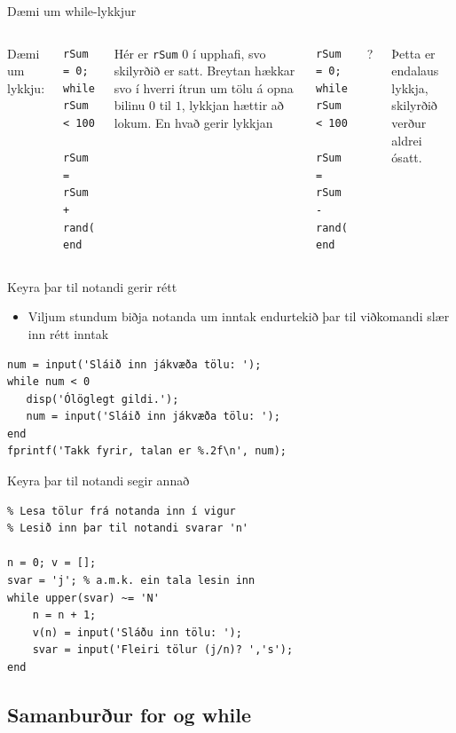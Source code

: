 \documentclass{beamer}
\begin{document}
\begin{frame}[fragile]{Dæmi um while-lykkjur}
\begin{columns}
\vspace{0.8cm}

Dæmi um lykkju:
\begin{verbatim}
rSum = 0;
while rSum < 100
   rSum = rSum + rand();
end
\end{verbatim}
Hér er \texttt{rSum} $0$ í upphafi, svo skilyrðið er satt. Breytan hækkar svo í hverri ítrun um tölu á opna bilinu $0$ til $1$, lykkjan hættir að lokum.\pause
{}
En hvað gerir lykkjan
\begin{verbatim}
rSum = 0;
while rSum < 100
   rSum = rSum - rand();
end
\end{verbatim}
?
\pause

Þetta er endalaus lykkja, skilyrðið verður aldrei ósatt.
\end{columns}
\end{frame}

\begin{frame}[fragile]{Keyra þar til notandi gerir rétt}
\begin{itemize}
 \item Viljum stundum biðja notanda um inntak endurtekið þar til viðkomandi slær inn rétt inntak
\end{itemize}
\begin{verbatim}
num = input('Sláið inn jákvæða tölu: ');
while num < 0
   disp('Ólöglegt gildi.');
   num = input('Sláið inn jákvæða tölu: ');
end
fprintf('Takk fyrir, talan er %.2f\n', num);
\end{verbatim}

\end{frame}


\begin{frame}[fragile]{Keyra þar til notandi segir annað}
\begin{verbatim}
% Lesa tölur frá notanda inn í vigur
% Lesið inn þar til notandi svarar 'n'

n = 0; v = [];
svar = 'j'; % a.m.k. ein tala lesin inn
while upper(svar) ~= 'N'
    n = n + 1;
    v(n) = input('Sláðu inn tölu: ');
    svar = input('Fleiri tölur (j/n)? ','s');
end
\end{verbatim}
\end{frame}

\subsection{Samanburður for og while}
\end{document}
